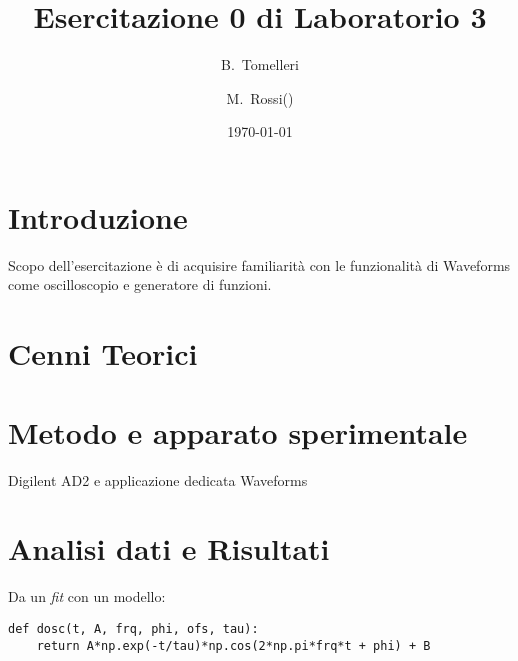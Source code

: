 \documentclass{article}[a4paper, 12pt, italian]
\title{Esercitazione 0 di Laboratorio 3}
\author{B.~Tomelleri\thanksdf \and M.~Rossi(\protect\footnotemark[1] )}
\date{\today}
\begin{document}
\maketitle

\section{Introduzione}
Scopo dell’esercitazione è di acquisire familiarità con le funzionalità
di Waveforms come oscilloscopio e generatore di funzioni.

\section{Cenni Teorici}

\section{Metodo e apparato sperimentale}
Digilent AD2 e applicazione dedicata Waveforms

\section{Analisi dati e Risultati}

Da un \emph{fit} con un modello:
\begin{lstlisting}
def dosc(t, A, frq, phi, ofs, tau):
    return A*np.exp(-t/tau)*np.cos(2*np.pi*frq*t + phi) + B
\end{lstlisting}
\end{document}
